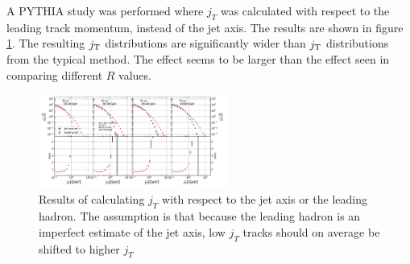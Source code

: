 A PYTHIA study was performed where $j_T$ was calculated with respect to the leading track momentum, instead of the jet axis. The results are shown in figure \ref{fig:RefComparison}. The resulting $j_{\rm T}$ distributions are significantly wider than $j_{\rm T}$ distributions from the typical method. The effect seems to be larger than the effect seen in comparing different $R$ values.

\begin{figure}[htp]
\centering
\includegraphics[width=0.55\textwidth]{figures/results/JetVsLeadingRefConst.pdf}
\caption{Results of calculating $j_T$ with respect to the jet axis or the leading hadron. The assumption is that because the leading hadron is an imperfect estimate of the jet axis, low $j_T$ tracks should on average be shifted to higher $j_T$}
\label{fig:RefComparison}
\end{figure}


